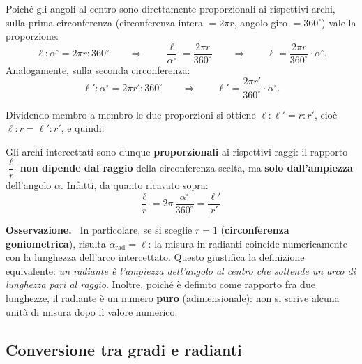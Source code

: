 \documentclass[11pt,a4paper]{article}
\newenvironment{osservazione}{%
  \par\vspace{4pt}\noindent
  \textbf{\color{orange!70!black}Osservazione.}\ 
}{%
  \par\vspace{4pt}
}
\newcommand{\formulabox}[1]{%
  \begin{center}
  \fbox{\parbox{0.9\linewidth}{\centering\vspace{2pt}#1\vspace{2pt}}}
  \end{center}
}
\begin{document}
Poich\'e gli angoli al centro sono direttamente proporzionali ai rispettivi archi, sulla prima circonferenza (circonferenza intera $=2\pi r$, angolo giro $=360^\circ$) vale la proporzione:
\[
\ell : \alpha^\circ = 2\pi r : 360^\circ
\qquad\Longrightarrow\qquad
\frac{\ell}{\alpha^\circ} = \frac{2\pi r}{360^\circ}
\qquad\Longrightarrow\qquad
\ell = \frac{2\pi r}{360^\circ}\cdot \alpha^\circ.
\]
Analogamente, sulla seconda circonferenza:
\[
\ell' : \alpha^\circ = 2\pi r' : 360^\circ
\qquad\Longrightarrow\qquad
\ell' = \frac{2\pi r'}{360^\circ}\cdot \alpha^\circ.
\]

Dividendo membro a membro le due proporzioni si ottiene $\ell : \ell' = r : r'$, cio\`e $\ell : r = \ell' : r'$, e quindi:
\formulabox{$\dfrac{\ell}{r} = \dfrac{\ell'}{r'}$}

Gli archi intercettati sono dunque \textbf{proporzionali} ai rispettivi raggi: il rapporto $\dfrac{\ell}{r}$ \textbf{non dipende dal raggio} della circonferenza scelta, ma \textbf{solo dall'ampiezza} dell'angolo $\alpha$. Infatti, da quanto ricavato sopra:
\[
\frac{\ell}{r} = 2\pi\,\frac{\alpha^\circ}{360^\circ} = \frac{\ell'}{r'}.
\]

\begin{center}
\end{center}

\begin{osservazione}
In particolare, se si sceglie $r=1$ (\textbf{circonferenza goniometrica}), risulta $\alpha_{\mathrm{rad}}=\ell$: la misura in radianti coincide numericamente con la lunghezza dell'arco intercettato. Questo giustifica la definizione equivalente: \emph{un radiante \`e l'ampiezza dell'angolo al centro che sottende un arco di lunghezza pari al raggio}. Inoltre, poich\'e \`e definito come rapporto fra due lunghezze, il radiante \`e un numero \textbf{puro} (adimensionale): non si scrive alcuna unit\`a di misura dopo il valore numerico.
\end{osservazione}

\subsection{Conversione tra gradi e radianti}
\end{document}
